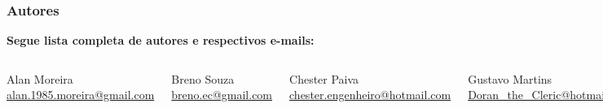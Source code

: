 
\begin{frame}
  \frametitle{Autores}

  \begin{alertblock}{}
    \vspace{5mm}

    \normalsize{\textbf{Segue lista completa de autores e respectivos e-mails:}}
    \vspace{5mm}

    \begin{columns}
      \centering
      \normalsize{Alan Moreira}
      \scriptsize{\href{mailto:alan.1985.moreira@gmail.com}{alan.1985.moreira@gmail.com}}
      \vspace{5mm}

      \normalsize{Breno Souza}
      \scriptsize{\href{mailto:breno.ec@gmail.com}{breno.ec@gmail.com}}
      \vspace{5mm}

      \normalsize{Chester Paiva}
      \scriptsize{\href{mailto:chester.engenheiro@hotmail.com}{chester.engenheiro@hotmail.com}}
      \vspace{5mm}

      \centering
      \normalsize{Gustavo Martins}
      \scriptsize{\href{mailto:Doran_the_Cleric@hotmail.com}{Doran\_the\_Cleric@hotmail.com}}
      \vspace{5mm}

      \normalsize{Rosiene Corrêa}
      \scriptsize{\href{mailto:rosienecorrea@yahoo.com.br}{rosienecorrea@yahoo.com.br}}
      \vspace{5mm}

      \normalsize{Vinícius Marinho}
      \scriptsize{\href{mailto:vinicius_marinho@ymail.com}{vinicius\_marinho@ymail.com}}
      \vspace{5mm}
    \end{columns}
  \end{alertblock}

\end{frame}
